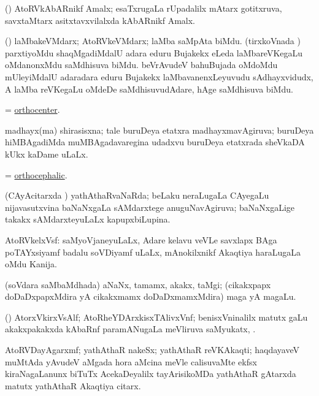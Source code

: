 \bentry
{}
\gl{\nA}
\bmng
(\ravi) AtoRVkAbARnikf Amalx; esaTxrugaLa rUpadalilx mAtarx gotitxruva, savxtaMtarx asitxtavxvilalxda kAbARnikf Amalx. 
\emng
\eentry

\bentry
{}
\gl{\nA}
\bmng
(\jAyx) laMbakeVMdarx; AtoRVkeVMdarx; laMba saMpAta biMdu. 
\banum
{} (tirxkoVnada \vi) parxtiyoMdu shaqMgadiMdalU adara eduru Bujakekx eLeda laMbareVKegaLu oMdanonxMdu saMdhisuva biMdu. 
 beVrAvudeV bahuBujada oMdoMdu mUleyiMdalU adaradara eduru Bujakekx laMbavanenxLeyuvudu sAdhayxvidudx, A laMba reVKegaLu oMdeDe saMdhisuvudAdare, hAge saMdhisuva biMdu. 
\eanum
\emng
\eentry

\bentry
{}
\gl{\nA}
\bmng
= \hyperlink{orthocenter}{orthocenter}. 
\emng
\eentry

\bentry
{}
\gl{\gu}
\bmng
madhayx(ma) shirasisxna; tale buruDeya etatxra madhayxmavAgiruva; buruDeya hiMBAgadiMda muMBAgadavaregina udadxvu buruDeya etatxrada sheVkaDA kUkx kaDame uLaLx. 
\emng
\eentry

\bentry
{}
\gl{\gu}
\bmng
= \hyperlink{orthocephalic}{orthocephalic}. 
\emng
\eentry

\bentry
{}
\gl{\gu}
\bmng
(CAyAcitarxda \vi) yathAthaRvaNaRda; beLaku neraLugaLa CAyegaLu nijavasutxvina baNaNxgaLa sAMdarxtege anuguNavAgiruva; baNaNxgaLige takakx sAMdarxteyuLaLx kapupxbiLupina. 
\emng
\eentry

\bentry
{}
\gl{\nA}
\bmng
AtoRVkelxVsf:  saMyoVjaneyuLaLx, Adare kelavu veVLe savxlapx BAga poTAYxsiyamf badalu soVDiyamf uLaLx, mAnokilxnikf Akaqtiya haraLugaLa oMdu Kanija. 
\emng
\eentry

\bentry
{}
\gl{\nA}
\bmng
(soVdara saMbaMdhada) aNaNx, tamamx, akakx, taMgi; (cikakxpapx doDaDxpapxMdira yA cikakxmamx doDaDxmamxMdira) maga yA magaLu. 
\emng
\eentry

\bentry
{}
\gl{\nA}
\bmng
(\ravi) AtorxVkirxVsAlf; AtoRheYDArxkisxTAlivxVnf; benisxVninalilx  matutx gaLu akakxpakakxda kAbaRnf paramANugaLa meVliruva saMyukatx, . 
\emng
\eentry

\bentry
{}
\gl{\nA}
\bmng
AtoRVDayAgarxmf; yathAthaR nakeSx; yathAthaR reVKAkaqti; haqdayaveV muMtAda yAvudeV aMgada hora aMcina meVle calisuvaMte ekfsx kiraNagaLanunx biTuTx AcekaDeyalilx tayArisikoMDa yathAthaR gAtarxda matutx yathAthaR Akaqtiya citarx. 
\emng
\eentry

